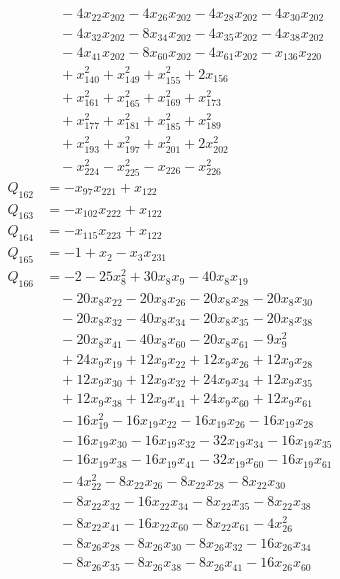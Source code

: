 \begin{align*}
&\quad -4x_{22}x_{202}-4x_{26}x_{202}-4x_{28}x_{202}-4x_{30}x_{202}\\
&\quad -4x_{32}x_{202}-8x_{34}x_{202}-4x_{35}x_{202}-4x_{38}x_{202}\\
&\quad -4x_{41}x_{202}-8x_{60}x_{202}-4x_{61}x_{202}-x_{136}x_{220}\\
&\quad +x_{140}^{2}+x_{149}^{2}+x_{155}^{2}+2x_{156}\\
&\quad +x_{161}^{2}+x_{165}^{2}+x_{169}^{2}+x_{173}^{2}\\
&\quad +x_{177}^{2}+x_{181}^{2}+x_{185}^{2}+x_{189}^{2}\\
&\quad +x_{193}^{2}+x_{197}^{2}+x_{201}^{2}+2x_{202}^{2}\\
&\quad -x_{224}^{2}-x_{225}^{2}-x_{226}-x_{226}^{2}\\
Q_{162}&=-x_{97}x_{221}+x_{122}\\
Q_{163}&=-x_{102}x_{222}+x_{122}\\
Q_{164}&=-x_{115}x_{223}+x_{122}\\
Q_{165}&=-1+x_{2}-x_{3}x_{231}\\
Q_{166}&=-2-25x_{8}^{2}+30x_{8}x_{9}-40x_{8}x_{19}\\
&\quad -20x_{8}x_{22}-20x_{8}x_{26}-20x_{8}x_{28}-20x_{8}x_{30}\\
&\quad -20x_{8}x_{32}-40x_{8}x_{34}-20x_{8}x_{35}-20x_{8}x_{38}\\
&\quad -20x_{8}x_{41}-40x_{8}x_{60}-20x_{8}x_{61}-9x_{9}^{2}\\
&\quad +24x_{9}x_{19}+12x_{9}x_{22}+12x_{9}x_{26}+12x_{9}x_{28}\\
&\quad +12x_{9}x_{30}+12x_{9}x_{32}+24x_{9}x_{34}+12x_{9}x_{35}\\
&\quad +12x_{9}x_{38}+12x_{9}x_{41}+24x_{9}x_{60}+12x_{9}x_{61}\\
&\quad -16x_{19}^{2}-16x_{19}x_{22}-16x_{19}x_{26}-16x_{19}x_{28}\\
&\quad -16x_{19}x_{30}-16x_{19}x_{32}-32x_{19}x_{34}-16x_{19}x_{35}\\
&\quad -16x_{19}x_{38}-16x_{19}x_{41}-32x_{19}x_{60}-16x_{19}x_{61}\\
&\quad -4x_{22}^{2}-8x_{22}x_{26}-8x_{22}x_{28}-8x_{22}x_{30}\\
&\quad -8x_{22}x_{32}-16x_{22}x_{34}-8x_{22}x_{35}-8x_{22}x_{38}\\
&\quad -8x_{22}x_{41}-16x_{22}x_{60}-8x_{22}x_{61}-4x_{26}^{2}\\
&\quad -8x_{26}x_{28}-8x_{26}x_{30}-8x_{26}x_{32}-16x_{26}x_{34}\\
&\quad -8x_{26}x_{35}-8x_{26}x_{38}-8x_{26}x_{41}-16x_{26}x_{60}\\

\end{align*}
